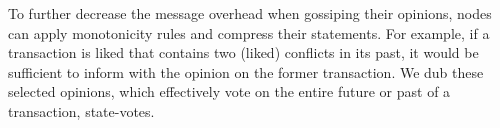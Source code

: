 \documentclass[../main.tex]{subfiles}
\begin{document}
To further decrease the message overhead when gossiping their opinions, nodes can apply monotonicity rules and compress their statements. For example, if a transaction is liked that contains two (liked) conflicts in its past, it would be sufficient to inform with the opinion on the former transaction. We dub these selected opinions, which effectively vote on the entire future or past of a transaction, state-votes. 
\end{document}
